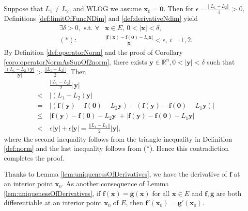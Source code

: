 \begin{solution}
  Suppose that $L_{1}\neq L_{2}$,
  and WLOG we assume $\mathbf{x}_{0}=\mathbf{0}$.
  Then for
  $\epsilon=\frac{||L_{1}-L_{2}||}{4}>0$, Definitions
  \ref{def:limitOfFuncNDim} and
  \ref{def:derivativeNdim} yield
  \begin{align*}
    \exists \delta>0,\text{ s.t. }
    \forall &\mathbf{x}\in E,\ 0<|\mathbf{x}|<\delta, \\
    (*):\quad
            &\frac{|\mathbf{f}(\mathbf{x})-\mathbf{f}(\mathbf{0})
              -L_{i}\mathbf{x}|}{|\mathbf{x}|}<\epsilon,\
    i=1,2.
  \end{align*}
  By Definition \ref{def:operatorNorm} and the proof of
  Corollary \ref{coro:operatorNormAsSupOf2norm}, there exists
  $\mathbf{y}\in \mathbb{R}^{n}, 0<|\mathbf{y}|<\delta$ such that
  $\frac{|(L_{1}-L_{2})\mathbf{y}|}{|\mathbf{y}|}
  >\frac{||L_{1}-L_{2}||}{2}$. Then
  \begin{align*}
    &\ \frac{||L_{1}-L_{2}||}{2}|\mathbf{y}|\\
    < &\ |(L_{1}-L_{2})\mathbf{y}| \\
    = &\ |(\mathbf{f}(\mathbf{y})-\mathbf{f}(\mathbf{0})-L_{2}\mathbf{y})
        -(\mathbf{f}(\mathbf{y})-\mathbf{f}(\mathbf{0})-L_{1}\mathbf{y})|\\
    \le &\ |\mathbf{f}(\mathbf{y})-\mathbf{f}(\mathbf{0})-L_{2}\mathbf{y}|
          +|\mathbf{f}(\mathbf{y})-\mathbf{f}(\mathbf{0})-L_{1}\mathbf{y}| \\
    < &\ \epsilon |\mathbf{y}|+\epsilon |\mathbf{y}|
    =\frac{||L_{1}-L_{2}||}{2}|\mathbf{y}|,
  \end{align*}
  where the second inequality follows from the triangle inequality
  in Definition \ref{def:norm} and
  the last inequality follows from ($*$).
  Hence this contradiction completes the proof.
\end{solution}

\begin{rem}
  Thanks to Lemma \ref{lem:uniquenessOfDerivatives},
  we have the derivative of $\mathbf{f}$ at an interior point
  $\mathbf{x}_0$.
  As another consequence of Lemma \ref{lem:uniquenessOfDerivatives},
  if $\mathbf{f}(\mathbf{x})=\mathbf{g}(\mathbf{x})$
  for all $\mathbf{x}\in E$ and $\mathbf{f},\mathbf{g}$
  are both differentiable at an interior point $\mathbf{x}_0$ of $E$,
  then $\mathbf{f}'(\mathbf{x}_0)=\mathbf{g}'(\mathbf{x}_0)$.
\end{rem}

